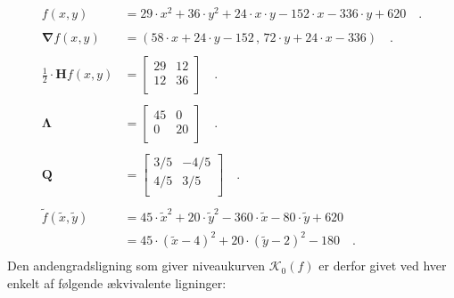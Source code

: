 \begin{example}[Ellipse] \label{exampEllip02}
\begin{equation}
\begin{aligned}
f(x,y) &= 29\cdot x^{2} + 36\cdot y^{2} + 24\cdot x \cdot y - 152\cdot x -336\cdot y + 620 \quad . \\   \\
\bm{\nabla}f(x,y) &= (58\cdot x + 24 \cdot y -152\, , \, 72\cdot y + 24 \cdot x - 336)  \quad . \\   \\
\frac{1}{2}\cdot \mathbf{H}f(x,y) &= \left[
                     \begin{array}{cc}
                       29 & 12 \\
                       12 & 36 \\
                     \end{array}
                   \right] \quad . \\  \\
\bm{\Lambda} &= \left[
                     \begin{array}{cc}
                       45 & 0 \\
                       0 & 20 \\
                     \end{array}
                   \right]\quad . \\   \\
\mathbf{Q} &= \left[
                     \begin{array}{cc}
                       3/5 & -4/5 \\
                       4/5 & 3/5 \\
                     \end{array}
                   \right]  \quad . \\  \\
\widetilde{f}(\widetilde{x}, \widetilde{y}) & =  45 \cdot \widetilde{x}^{2} + 20 \cdot \widetilde{y}^{2} - 360\cdot \widetilde{x} - 80\cdot \widetilde{y} + 620 \\
&= 45\cdot\left( \widetilde{x} - 4 \right)^{2} + 20\cdot\left(\widetilde{y} - 2 \right)^{2} - 180  \quad. \\
\end{aligned}
\end{equation}
Den andengradsligning som giver niveaukurven $\mathcal{K}_{0}(f)$ er derfor givet ved hver enkelt af følgende ækvivalente ligninger:
\begin{equation}
\begin{aligned}

\end{aligned}
\end{equation}
\end{example}
